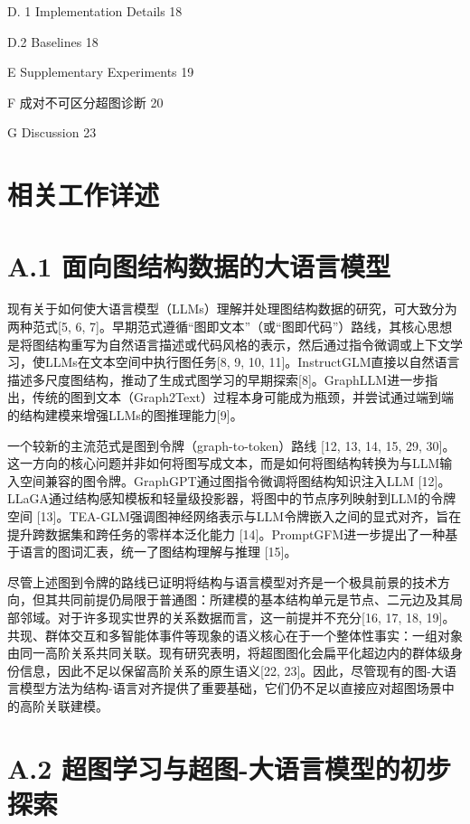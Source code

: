 \documentclass[10pt]{article}
\begin{document}
D. 1 Implementation Details 18

D.2 Baselines 18

E Supplementary Experiments 19

F 成对不可区分超图诊断 20

G Discussion 23

\section*{相关工作详述}

\section*{A.1 面向图结构数据的大语言模型}

现有关于如何使大语言模型（LLMs）理解并处理图结构数据的研究，可大致分为两种范式[5, 6, 7]。早期范式遵循“图即文本”（或“图即代码”）路线，其核心思想是将图结构重写为自然语言描述或代码风格的表示，然后通过指令微调或上下文学习，使LLMs在文本空间中执行图任务[8, 9, 10, 11]。InstructGLM直接以自然语言描述多尺度图结构，推动了生成式图学习的早期探索[8]。GraphLLM进一步指出，传统的图到文本（Graph2Text）过程本身可能成为瓶颈，并尝试通过端到端的结构建模来增强LLMs的图推理能力[9]。

一个较新的主流范式是图到令牌（graph-to-token）路线 [12, 13, 14, 15, 29, 30]。这一方向的核心问题并非如何将图写成文本，而是如何将图结构转换为与LLM输入空间兼容的图令牌。GraphGPT通过图指令微调将图结构知识注入LLM [12]。LLaGA通过结构感知模板和轻量级投影器，将图中的节点序列映射到LLM的令牌空间 [13]。TEA-GLM强调图神经网络表示与LLM令牌嵌入之间的显式对齐，旨在提升跨数据集和跨任务的零样本泛化能力 [14]。PromptGFM进一步提出了一种基于语言的图词汇表，统一了图结构理解与推理 [15]。

尽管上述图到令牌的路线已证明将结构与语言模型对齐是一个极具前景的技术方向，但其共同前提仍局限于普通图：所建模的基本结构单元是节点、二元边及其局部邻域。对于许多现实世界的关系数据而言，这一前提并不充分[16, 17, 18, 19]。共现、群体交互和多智能体事件等现象的语义核心在于一个整体性事实：一组对象由同一高阶关系共同关联。现有研究表明，将超图图化会扁平化超边内的群体级身份信息，因此不足以保留高阶关系的原生语义[22, 23]。因此，尽管现有的图-大语言模型方法为结构-语言对齐提供了重要基础，它们仍不足以直接应对超图场景中的高阶关联建模。

\section*{A.2 超图学习与超图-大语言模型的初步探索}
\end{document}
